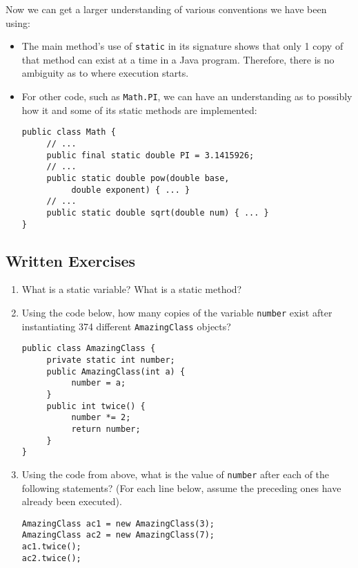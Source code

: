 \par Now we can get a larger understanding of various conventions we have been using:
\begin{itemize}
\item The main method's use of \verb|static| in its signature shows that only 1 copy of that method can exist at a time in a Java program. Therefore, there is no ambiguity as to where execution starts.
\item For other code, such as \verb|Math.PI|, we can have an understanding as to possibly how it and some of its static methods are implemented:
\begin{lstlisting}
public class Math {
     // ...
     public final static double PI = 3.1415926;
     // ...
     public static double pow(double base,
          double exponent) { ... }
     // ...
     public static double sqrt(double num) { ... }
}
\end{lstlisting}

\end{itemize}

\subsection{Written Exercises}

\begin{enumerate}

\item What is a static variable? What is a static method?

\item Using the code below, how many copies of the variable \verb|number| exist after instantiating 374 different \verb|AmazingClass| objects?
\begin{lstlisting}
public class AmazingClass {
     private static int number;
     public AmazingClass(int a) {
          number = a;
     }
     public int twice() {
          number *= 2;
          return number;
     }
}
\end{lstlisting}

\item Using the code from above, what is the value of \verb|number| after each of the following statements? (For each line below, assume the preceding ones have already been executed).
\begin{lstlisting}
AmazingClass ac1 = new AmazingClass(3);
AmazingClass ac2 = new AmazingClass(7);
ac1.twice();
ac2.twice();
\end{lstlisting}

\end{enumerate}